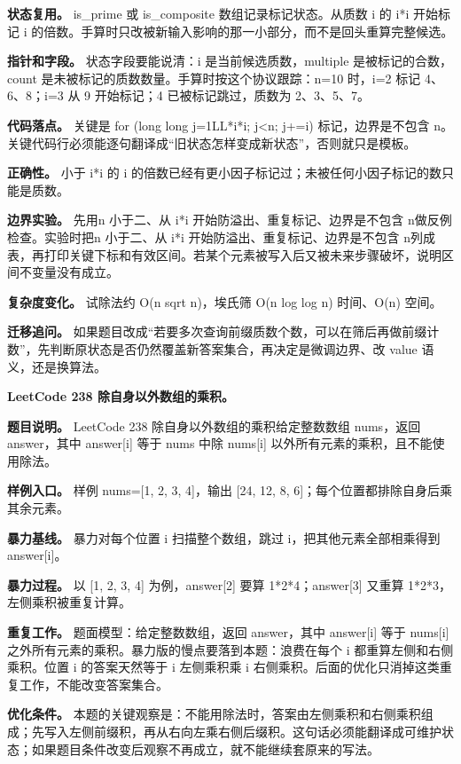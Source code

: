 \textbf{状态复用。} is\_prime 或 is\_composite 数组记录标记状态。从质数 i 的 i*i 开始标记 i 的倍数。手算时只改被新输入影响的那一小部分，而不是回头重算完整候选。

\textbf{指针和字段。} 状态字段要能说清：i 是当前候选质数，multiple 是被标记的合数，count 是未被标记的质数数量。手算时按这个协议跟踪：n=10 时，i=2 标记 4、6、8；i=3 从 9 开始标记；4 已被标记跳过，质数为 2、3、5、7。

\textbf{代码落点。} 关键是 for (long long j=1LL*i*i; j<n; j+=i) 标记，边界是不包含 n。关键代码行必须能逐句翻译成“旧状态怎样变成新状态”，否则就只是模板。

\textbf{正确性。} 小于 i*i 的 i 的倍数已经有更小因子标记过；未被任何小因子标记的数只能是质数。

\textbf{边界实验。} 先用n 小于二、从 i*i 开始防溢出、重复标记、边界是不包含 n做反例检查。实验时把n 小于二、从 i*i 开始防溢出、重复标记、边界是不包含 n列成表，再打印关键下标和有效区间。若某个元素被写入后又被未来步骤破坏，说明区间不变量没有成立。

\textbf{复杂度变化。} 试除法约 O(n sqrt n)，埃氏筛 O(n log log n) 时间、O(n) 空间。

\textbf{迁移追问。} 如果题目改成“若要多次查询前缀质数个数，可以在筛后再做前缀计数”，先判断原状态是否仍然覆盖新答案集合，再决定是微调边界、改 value 语义，还是换算法。

\noindent\textbf{LeetCode 238 除自身以外数组的乘积。}

\textbf{题目说明。} LeetCode 238 除自身以外数组的乘积给定整数数组 nums，返回 answer，其中 answer[i] 等于 nums 中除 nums[i] 以外所有元素的乘积，且不能使用除法。

\textbf{样例入口。} 样例 nums=[1, 2, 3, 4]，输出 [24, 12, 8, 6]；每个位置都排除自身后乘其余元素。

\textbf{暴力基线。} 暴力对每个位置 i 扫描整个数组，跳过 i，把其他元素全部相乘得到 answer[i]。

\textbf{暴力过程。} 以 [1, 2, 3, 4] 为例，answer[2] 要算 1*2*4；answer[3] 又重算 1*2*3，左侧乘积被重复计算。

\textbf{重复工作。} 题面模型：给定整数数组，返回 answer，其中 answer[i] 等于 nums[i] 之外所有元素的乘积。暴力版的慢点要落到本题：浪费在每个 i 都重算左侧和右侧乘积。位置 i 的答案天然等于 i 左侧乘积乘 i 右侧乘积。后面的优化只消掉这类重复工作，不能改变答案集合。

\textbf{优化条件。} 本题的关键观察是：不能用除法时，答案由左侧乘积和右侧乘积组成；先写入左侧前缀积，再从右向左乘右侧后缀积。这句话必须能翻译成可维护状态；如果题目条件改变后观察不再成立，就不能继续套原来的写法。

